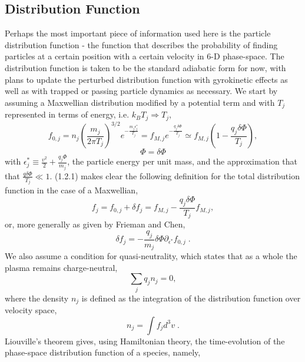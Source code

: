 \documentclass[12pt]{article}
\numberwithin{equation}{subsection}
\begin{document}
\subsection{Distribution Function}
   \quad Perhaps the most important piece of information used here is the particle distribution function - the function that describes the
probability of finding particles at a certain position with a certain velocity in 6-D phase-space. The distribution function is taken to be
the standard adiabatic form for now, with plans to update the perturbed distribution function with gyrokinetic effects as well as with trapped
or passing particle dynamics as necessary. We start by assuming a Maxwellian distribution modified by a potential term and with $T_j$ represented
in terms of energy, i.e. $k_B T_j \Rightarrow T_j$,
   \begin{equation}
      f_{0,j} = n_j\left(\frac{m_j}{2\pi T_j}\right)^{3/2}e^{-\frac{m_j \epsilon^*_j}{T_j}}
              = f_{M,j}e^{-\frac{q_j\delta\Phi}{T_j}} \simeq f_{M,j}(1-\frac{q_j\delta\Phi}{T_j}),
   \end{equation}
   \begin{equation}
      \Phi = \delta\Phi
   \end{equation}
with $\epsilon^*_j \equiv \frac{v^2}{2} + \frac{q_j\Phi}{m_j}$, the particle energy per unit mass, and the approximation that
that $\frac{q\delta\Phi}{T_j} \ll 1$. (1.2.1) makes clear the following definition for the total distribution function in the
case of a Maxwellian,
   \begin{equation}
      f_j = f_{0,j} + \delta f_j = f_{M,j} - \frac{q_j\delta\Phi}{T_j}f_{M,j},
   \end{equation}
or, more generally as given by Frieman and Chen\cite{FriemanChen},
   \begin{equation}
      \delta f_j = -\frac{q_j}{m_j}\delta\Phi\partial_{\epsilon^*}f_{0,j}\;.
   \end{equation}
We also assume a condition for quasi-neutrality, which states that as a whole the plasma remains charge-neutral,
   \begin{equation}
      \sum\limits_{j}q_j n_j = 0,
   \end{equation}
where the density $n_j$ is defined as the integration of the distribution function over velocity space,
   \begin{equation}
      n_j = \int f_j d^{3}v\;.
   \end{equation}
Liouville's theorem gives, using Hamiltonian theory, the time-evolution of the phase-space distribution function of a species, namely\cite{WessonD},
\end{document}
